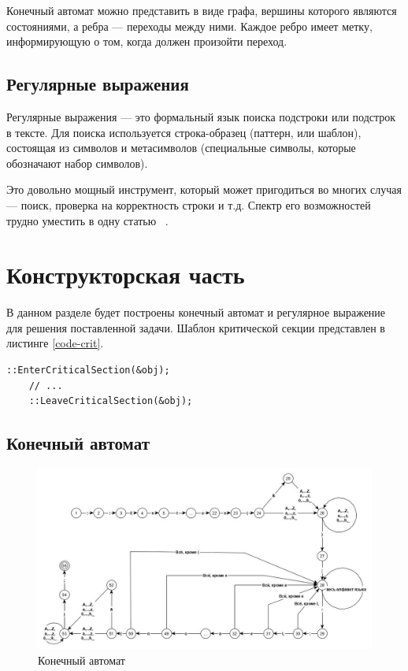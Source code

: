 \documentclass[12pt, a4paper]{report}
\begin{document}
	Конечный автомат можно представить в виде графа, вершины которого являются состояниями, а ребра — переходы между ними. Каждое ребро имеет метку, информирующую о том, когда должен произойти переход.

	\section{Регулярные выражения}
	\hspace{0.5cm}Регулярные выражения — это формальный язык поиска подстроки или подстрок в тексте. Для поиска используется строка-образец (паттерн, или шаблон), состоящая из символов и метасимволов (специальные символы, которые обозначают набор символов).
	
	Это довольно мощный инструмент, который может пригодиться во многих случая —
	поиск, проверка на корректность строки и т.д. Спектр его возможностей трудно уместить
	в одну статью ~\cite{regexp}.
	
	\chapter{Конструкторская часть}
	\hspace{0.5cm}В данном разделе будет построены конечный автомат и регулярное выражение для решения поставленной задачи.
	Шаблон критической секции представлен в листинге \ref{code-crit}.
	\begin{lstlisting}[label=code-crit,caption=Шаблон критической секции]
	::EnterCriticalSection(&obj);
	// ...
	::LeaveCriticalSection(&obj);
	\end{lstlisting}
	
	\section{Конечный автомат}
	\begin{figure}[ht!]
		\centering
		\includegraphics[width=1\linewidth]{ka.jpg}
		\caption{Конечный автомат}
		\label{ris:ka}
	\end{figure}
\end{document}
